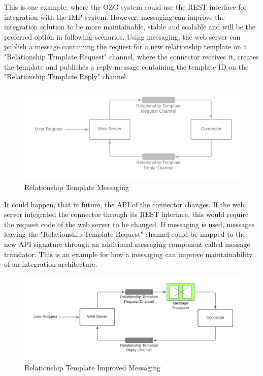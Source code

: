This is one example, where the OZG system could use the REST interface for integration with the IMP system. However, messaging can improve the integration solution to be more maintainable, stable and scalable and will be the preferred option in following scenarios. Using messaging, the web server can publish a message containing the request for a new relationship template on a "Relationship Template Request" channel, where the connector receives it, creates the template and publishes a reply message containing the template ID on the "Relationship Template Reply" channel.

\begin{figure}[h]
    \centering
    \caption{Relationship Template Messaging}
    \includegraphics[scale=0.3]{Diagrams/Integration Architecture 1/Overview/Relationship Template Messaging.png}
\end{figure}

It could happen, that in future, the API of the connector changes. If the web server integrated the connector through its REST interface, this would require the request code of the web server to be changed. If messaging is used, messages leaving the "Relationship Template Request" channel could be mapped to the new API signature through an additional messaging component called message translator. This is an example for how a messaging can improve maintainability of an integration architecture.

\begin{figure}[h]
    \centering
    \caption{Relationship Template Improved Messaging}
    \includegraphics[scale=0.3]{Diagrams/Integration Architecture 1/Overview/Relationship Template Messaging Improved.png}
\end{figure}


